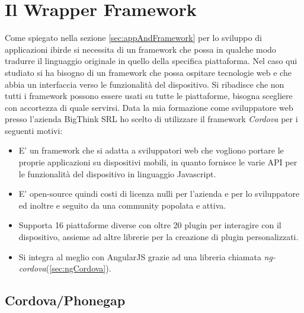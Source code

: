 \section{Il Wrapper Framework}
Come spiegato nella sezione \ref{sec:appAndFramework} per lo sviluppo di applicazioni ibirde si necessita di un framework che possa in qualche modo tradurre il linguaggio originale in quello della specifica piattaforma.
Nel caso qui studiato si ha bisogno di un framework che possa ospitare tecnologie web e che abbia un interfaccia verso le funzionalità del dispositivo. Si ribadisce che non tutti i framework possono essere usati su tutte le piattaforme, bisogna scegliere con accortezza di quale servirsi.
Data la mia formazione come sviluppatore web presso l'azienda BigThink SRL ho scelto di utilizzare il framework \emph{Cordova} per i seguenti motivi:
\begin{itemize}
\item E' un framework che si adatta a sviluppatori web che vogliono portare le proprie applicazioni su dispositivi mobili, in quanto fornisce le varie API per le funzionalità del dispositivo in linguaggio Javascript.
\item E' open-source quindi costi di licenza nulli per l'azienda e per lo sviluppatore ed inoltre e seguito da una community popolata e attiva.
\item Supporta 16 piattaforme diverse con oltre 20 plugin per interagire con il dispositivo, assieme ad altre librerie per la creazione di plugin personalizzati.
\item Si integra al meglio con AngularJS grazie ad una libreria chiamata \emph{ng-cordova}(\ref{sec:ngCordova}).
\end{itemize}

\subsection{Cordova/Phonegap}

